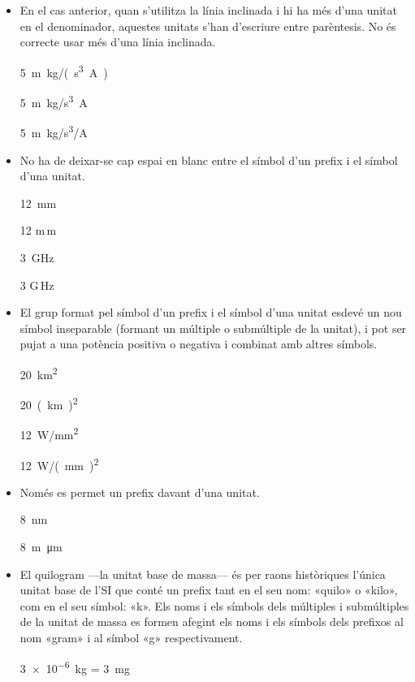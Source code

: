 \begin{itemize}
\item En el cas anterior, quan s'utilitza la línia inclinada i hi ha més
d'una unitat en el denominador, aquestes unitats s'han d'escriure
entre parèntesis. No és correcte usar més d'una línia inclinada.

\textcolor{Green}\faCheckSquare{} \qty{5}{m.kg/(s^3.A)}

\textcolor{Red}\faTimesCircle{} \qty{5}{m.kg/s^3.A}

\textcolor{Red}\faTimesCircle{} \qty{5}{m.kg/s^3/A}


\item No ha de deixar-se cap espai en blanc entre el símbol d'un prefix i
el símbol d'una unitat.

\textcolor{Green}\faCheckSquare{} \qty{12}{mm}

\textcolor{Red}\faTimesCircle{} 12 m\,m

\textcolor{Green}\faCheckSquare{}  \qty{3}{GHz}

\textcolor{Red}\faTimesCircle{}  3 G\,Hz


\item El grup format pel símbol d'un prefix i el símbol d'una unitat
esdevé un nou símbol inseparable (formant un múltiple o submúltiple
de la unitat), i pot ser pujat a una potència positiva o negativa i
combinat amb altres símbols.

\textcolor{Green}\faCheckSquare{} \qty{20}{km^2}

\textcolor{Red}\faTimesCircle{} \qty{20}{(km)^2}

\textcolor{Green}\faCheckSquare{}  \qty{12}{W/mm^2}

\textcolor{Red}\faTimesCircle{}  \qty{12}{W/(mm)^2}


\item Només es permet un prefix davant d'una unitat.

\textcolor{Green}\faCheckSquare{} \qty{8}{nm}

\textcolor{Red}\faTimesCircle{} \qty{8}{m\micro m}


\item El quilogram ---la unitat base de massa--- és per raons històriques l'única unitat base de l'SI que conté un prefix tant en el seu nom: «quilo» o «kilo», com en el seu símbol: «k». Els noms i els símbols dels múltiples i submúltiples de la unitat de massa es formen afegint els noms i els símbols dels prefixos al nom «gram» i al símbol «g» respectivament.

\textcolor{Green}\faCheckSquare{} \qty{3e-6}{kg} = \qty{3}{mg}


\end{itemize}
